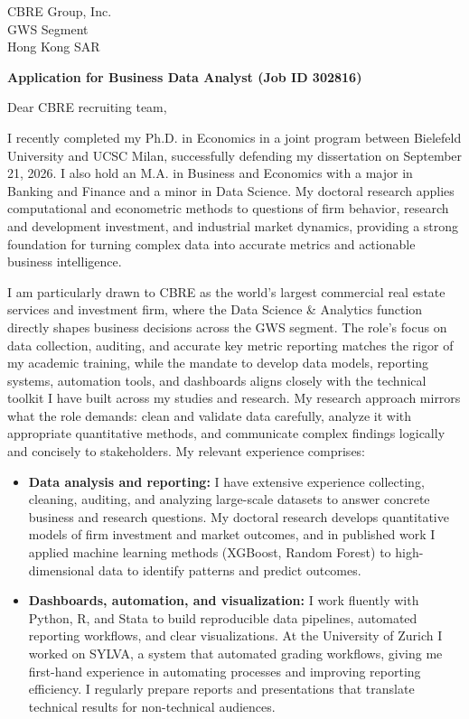 \documentclass[11pt]{article}
\begin{document}
\vspace{0.1cm}

\vspace{0.1cm}

\noindent
CBRE Group, Inc. \\
GWS Segment \\
Hong Kong SAR

\vspace{0.12cm}

\noindent
\textbf{Application for Business Data Analyst (Job ID 302816)}

\vspace{0.1cm}

\noindent Dear CBRE recruiting team,

I recently completed my Ph.D. in Economics in a joint program between Bielefeld University and UCSC Milan,
successfully defending my dissertation on September 21, 2026.
I also hold an M.A. in Business and Economics with a major in Banking and Finance and a minor in Data Science.
My doctoral research applies computational and econometric methods to questions of firm behavior,
research and development investment, and industrial market dynamics,
providing a strong foundation for turning complex data into accurate metrics and actionable business intelligence.

I am particularly drawn to CBRE as the world's largest commercial real estate services and investment firm,
where the Data Science \& Analytics function directly shapes business decisions across the GWS segment.
The role's focus on data collection, auditing, and accurate key metric reporting matches the rigor of my academic training,
while the mandate to develop data models, reporting systems, automation tools, and dashboards
aligns closely with the technical toolkit I have built across my studies and research.
My research approach mirrors what the role demands:
clean and validate data carefully, analyze it with appropriate quantitative methods,
and communicate complex findings logically and concisely to stakeholders.
My relevant experience comprises:

\begin{itemize}
    \item \textbf{Data analysis and reporting:} I have extensive experience collecting, cleaning, auditing, and analyzing large-scale datasets to answer concrete business and research questions. My doctoral research develops quantitative models of firm investment and market outcomes, and in published work I applied machine learning methods (XGBoost, Random Forest) to high-dimensional data to identify patterns and predict outcomes.
    \item \textbf{Dashboards, automation, and visualization:} I work fluently with Python, R, and Stata to build reproducible data pipelines, automated reporting workflows, and clear visualizations. At the University of Zurich I worked on SYLVA, a system that automated grading workflows, giving me first-hand experience in automating processes and improving reporting efficiency. I regularly prepare reports and presentations that translate technical results for non-technical audiences.
\end{itemize}
\end{document}
